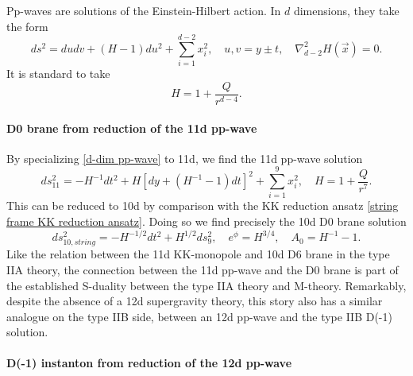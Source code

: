 Pp-waves are solutions of the Einstein-Hilbert action.
In $d$ dimensions, they take the form
\begin{equation}
ds^2 = dudv+(H-1)du^2+\sum_{i=1}^{d-2}x_i^2,\quad
u,v = y\pm t,\quad
\nabla^2_{d-2} H(\vec{x})=0.
\label{d-dim pp-wave}
\end{equation}
It is standard to take
\begin{equation}
H=1+\frac{Q}{r^{d-4}}.
\end{equation}

\paragraph{D0 brane from reduction of the 11d pp-wave}
By specializing \eqref{d-dim pp-wave} to 11d, we find the 11d pp-wave solution
\begin{equation}
ds_{11}^2
=
-H^{-1}dt^2+H[dy+(H^{-1}-1)dt]^2
+\sum_{i=1}^9x_i^2,\quad
H=1+\frac{Q}{r^7}.
\end{equation}
This can be reduced to 10d by comparison with the KK reduction ansatz \eqref{string frame KK reduction ansatz}.
Doing so we find precisely the 10d D0 brane solution \cite{Stelle:1998xg}
\begin{equation}
ds_{10,string}^2
=-H^{-1/2} dt^2+H^{1/2}ds_9^2,\quad
e^{\phi} = H^{3/4},\quad
A_0 = H^{-1}-1.
\end{equation}
Like the relation between the 11d KK-monopole and 10d D6 brane in the type IIA theory, the connection between the 11d pp-wave and the D0 brane is part of the established S-duality between the type IIA theory and M-theory. Remarkably, despite the absence of a 12d supergravity theory, this story also has a similar analogue on the type IIB side, between an 12d pp-wave and the type IIB D(-1) solution.


\paragraph{D(-1) instanton from reduction of the 12d pp-wave}


